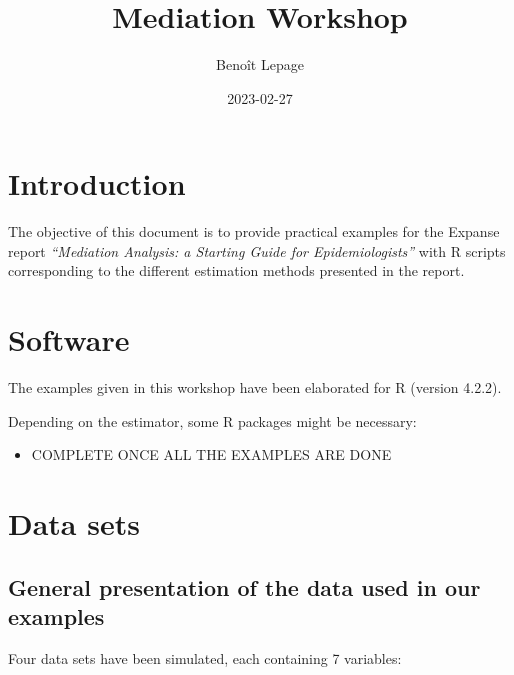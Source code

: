 \documentclass[
]{book}
\title{Mediation Workshop}
\author{Benoît Lepage}
\date{2023-02-27}
\providecommand{\tightlist}{%
  \setlength{\itemsep}{0pt}\setlength{\parskip}{0pt}}
\begin{document}
\maketitle

{
\setcounter{tocdepth}{1}
\tableofcontents
}
\hypertarget{introduction}{%
\chapter{Introduction}\label{introduction}}

The objective of this document is to provide practical examples for the Expanse report \emph{``Mediation Analysis: a Starting Guide for Epidemiologists''} with R scripts corresponding to the different estimation methods presented in the report.

\hypertarget{software}{%
\chapter{Software}\label{software}}

The examples given in this workshop have been elaborated for R (version 4.2.2).

Depending on the estimator, some R packages might be necessary:

\begin{itemize}
\tightlist
\item
  COMPLETE ONCE ALL THE EXAMPLES ARE DONE
\end{itemize}

\hypertarget{data-sets}{%
\chapter{Data sets}\label{data-sets}}

\hypertarget{general-presentation-of-the-data-used-in-our-examples}{%
\section{General presentation of the data used in our examples}\label{general-presentation-of-the-data-used-in-our-examples}}

Four data sets have been simulated, each containing 7 variables:
\end{document}
